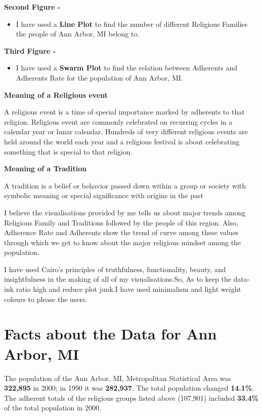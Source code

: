 \documentclass[11pt]{article}
\providecommand{\tightlist}{%
      \setlength{\itemsep}{0pt}\setlength{\parskip}{0pt}}
\begin{document}
\textbf{Second Figure - }

\begin{itemize}
\tightlist
\item
  I have used a \textbf{Line Plot} to find the number of different
  Religious Families the people of Ann Arbor, MI belong to.
\end{itemize}

\textbf{Third Figure - }

\begin{itemize}
\tightlist
\item
  I have used a \textbf{Swarm Plot} to find the relation between
  Adherents and Adherents Rate for the population of Ann Arbor, MI.
\end{itemize}

\textbf{Meaning of a Religious event}

A religious event is a time of special importance marked by adherents to
that religion. Religious event are commonly celebrated on recurring
cycles in a calendar year or lunar calendar. Hundreds of very different
religious events are held around the world each year and a religious
festival is about celebrating something that is special to that
religion.

\textbf{Meaning of a Tradition}

A tradition is a belief or behavior passed down within a group or
society with symbolic meaning or special significance with origins in
the past

I believe the visualisations provided by me tells us about major trends
among Religious Family and Traditions followed by the people of this
region. Also, Adherence Rate and Adherents show the trend of curve among
these values through which we get to know about the major religious
mindset among the population.

I have used Cairo's principles of truthfulness, functionality, beauty,
and insightfulness in the making of all of my visualisations.So, As to
keep the data-ink ratio high and reduce plot junk.I have used minimalism
and light weight colours to please the users.

    \section{Facts about the Data for Ann Arbor,
MI}\label{facts-about-the-data-for-ann-arbor-mi}

The population of the Ann Arbor, MI, Metropolitan Statistical Area was
\textbf{322,895} in 2000; in 1990 it was \textbf{282,937}. The total
population changed \textbf{14.1\%}. The adherent totals of the religious
groups listed above (107,901) included \textbf{33.4\%} of the total
population in 2000.
\end{document}
